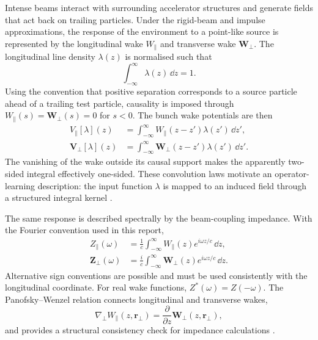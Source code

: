 Intense beams interact with surrounding accelerator structures and generate fields that act back on trailing particles. Under the rigid-beam and impulse approximations, the response of the environment to a point-like source is represented by the longitudinal wake $W_{\parallel}$ and transverse wake $\bm W_{\perp}$. The longitudinal line density $\lambda(z)$ is normalised such that
\begin{equation}
    \int_{-\infty}^{\infty}\lambda(z)\,\dd z=1.
\end{equation}
Using the convention that positive separation corresponds to a source particle ahead of a trailing test particle, causality is imposed through $W_{\parallel}(s)=\bm W_{\perp}(s)=0$ for $s<0$. The bunch wake potentials are then
\begin{align}
    V_{\parallel}[\lambda](z)
    &=
    \int_{-\infty}^{\infty}
    W_{\parallel}(z-z')\lambda(z')\,\dd z',
    \label{eq:long_wake_potential_revised}
    \\
    \bm V_{\perp}[\lambda](z)
    &=
    \int_{-\infty}^{\infty}
    \bm W_{\perp}(z-z')\lambda(z')\,\dd z'.
    \label{eq:trans_wake_potential_revised}
\end{align}
The vanishing of the wake outside its causal support makes the apparently two-sided integral effectively one-sided. These convolution laws motivate an operator-learning description: the input function $\lambda$ is mapped to an induced field through a structured integral kernel \cite{metral_wake_2021}.

The same response is described spectrally by the beam-coupling impedance. With the Fourier convention used in this report,
\begin{align}
    Z_{\parallel}(\omega)
    &=
    \frac{1}{c}
    \int_{-\infty}^{\infty}
    W_{\parallel}(z)e^{i\omega z/c}\,\dd z,
    \label{eq:Zparallel_revised}
    \\
    \bm Z_{\perp}(\omega)
    &=
    \frac{i}{c}
    \int_{-\infty}^{\infty}
    \bm W_{\perp}(z)e^{i\omega z/c}\,\dd z.
    \label{eq:Ztrans_revised}
\end{align}
Alternative sign conventions are possible and must be used consistently with the longitudinal coordinate. For real wake functions, $Z^{*}(\omega)=Z(-\omega)$. The Panofsky--Wenzel relation connects longitudinal and transverse wakes,
\begin{equation}
    \nabla_{\perp}W_{\parallel}(z,\bm r_{\perp})
    =
    \frac{\partial}{\partial z}\bm W_{\perp}(z,\bm r_{\perp}),
    \label{eq:PW}
\end{equation}
and provides a structural consistency check for impedance calculations \cite{metral_wake_2021,kim_mbtrack2_cuda_2025}.

